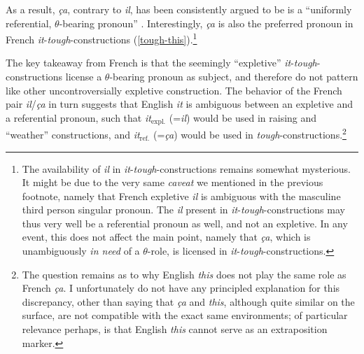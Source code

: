\documentclass[11pt]{article}
\begin{document}
As a result, \textit{ça}, contrary to \textit{il}, has been consistently argued to be is a ``uniformly referential, $\theta$-bearing pronoun'' \cite{Kayne1983,Pollock1983,Jaeggli1981,Zaring1994}. Interestingly, \textit{ça} is also the preferred pronoun in French \textit{it}-\textit{tough}-constructions (\ref{tough-this}).\footnote{The availability of \textit{il} in \textit{it}-\textit{tough}-constructions remains somewhat mysterious. It might be due to the very same \textit{caveat} we mentioned in the previous footnote, namely that French expletive \textit{il} is ambiguous with the masculine third person singular pronoun. The \textit{il} present in \textit{it}-\textit{tough}-constructions may thus very well be a referential pronoun as well, and not an expletive. In any event, this does not affect the main point, namely that \textit{ça}, which is unambiguously \textit{in need} of a $\theta$-role, is licensed in \textit{it}-\textit{tough}-constructions.}
\begin{exe}
	\ex
	\normalsize
	\begin{xlist}
		\label{tough-it}
		\label{tough-this}
	\end{xlist}
\end{exe}

The key takeaway from French is that the seemingly ``expletive'' \textit{it}-\textit{tough}-constructions license a $\theta$-bearing pronoun as subject, and therefore do not pattern like other uncontroversially expletive construction. The behavior of the French pair \textit{il}/\textit{ça} in turn suggests that English \textit{it} is ambiguous between an expletive and a referential pronoun, such that \textit{it}$_{\text{expl.}}$ (=\textit{il}) would be used in raising and ``weather'' constructions, and \textit{it}$_{\text{ref.}}$ (=\textit{ça}) would be used in \textit{tough}-constructions.\footnote{The question remains as to why English \textit{this} does not play the same role as French \textit{ça}. I unfortunately do not have any principled explanation for this discrepancy, other than saying that \textit{ça} and \textit{this}, although quite similar on the surface, are not compatible with the exact same environments; of particular relevance perhaps, is that English \textit{this} cannot serve as an extraposition marker.}
\end{document}
